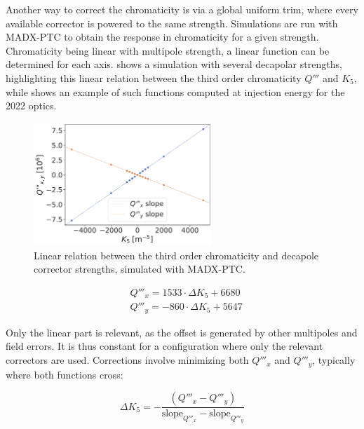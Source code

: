 Another way to correct the chromaticity is via a global uniform trim, where every available
corrector is powered to the same strength. Simulations are run with MADX-PTC to obtain the response
in chromaticity for a given strength. Chromaticity being linear with multipole strength, a linear
function can be determined for each axis.
 shows a simulation with several decapolar strengths,
highlighting this linear relation between the third order chromaticity $Q'''$ and $K_5$, while
 shows an example of such functions computed
at injection energy for the 2022 optics.

\begin{figure}[H]
  \centering
  \includegraphics[width=0.6\textwidth]{images/dq3_k5.pdf}
  \caption{Linear relation between the third order chromaticity and decapole corrector strengths,
           simulated with MADX-PTC.}
  \label{fig:corrections-dq3_versus_k5}
\end{figure}

\begin{equation}
  \begin{aligned}
    &Q'''_x = 1533 \cdot \Delta K_5 + 6680 \\
    &Q'''_y = -860 \cdot \Delta K_5 + 5647
  \end{aligned}
  \label{eq:corrections:chromaticity_affine_function_ptc}
\end{equation}

Only the linear part is relevant, as the offset is generated by other multipoles and field errors.
It is thus constant for a configuration where only the relevant correctors are used.
Corrections involve minimizing both $Q'''_x$ and $Q'''_y$, typically where both functions cross:

\begin{equation}
  \Delta K_5 = -\frac{(Q'''_x - Q'''_y)}{\text{slope}_{Q'''_x} - \text{slope}_{Q'''_y}}
  \label{eq:corrections:chromaticity_global_correction}
\end{equation}
